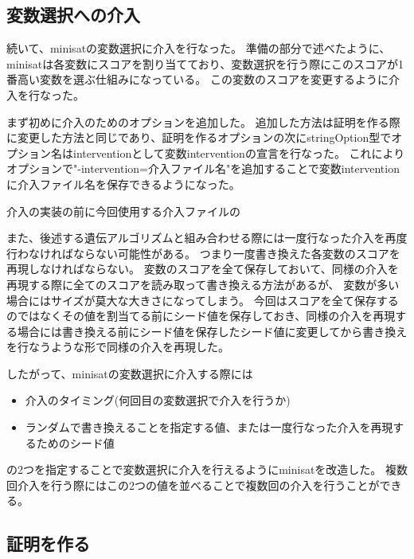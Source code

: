 \subsection{変数選択への介入}







続いて、minisatの変数選択に介入を行なった。
準備の部分で述べたように、minisatは各変数にスコアを割り当てており、変数選択を行う際にこのスコアが1番高い変数を選ぶ仕組みになっている。
この変数のスコアを変更するように介入を行なった。

まず初めに介入のためのオプションを追加した。
追加した方法は証明を作る際に変更した方法と同じであり、証明を作るオプションの次にstringOption型でオプション名はinterventionとして変数interventionの宣言を行なった。
これによりオプションで"-intervention=介入ファイル名"を追加することで変数interventionに介入ファイル名を保存できるようになった。

介入の実装の前に今回使用する介入ファイルの

また、後述する遺伝アルゴリズムと組み合わせる際には一度行なった介入を再度行わなければならない可能性がある。
つまり一度書き換えた各変数のスコアを再現しなければならない。
変数のスコアを全て保存しておいて、同様の介入を再現する際に全てのスコアを読み取って書き換える方法があるが、
変数が多い場合にはサイズが莫大な大きさになってしまう。
今回はスコアを全て保存するのではなくその値を割当てる前にシード値を保存しておき、同様の介入を再現する場合には書き換える前にシード値を保存したシード値に変更してから書き換えを行なうような形で同様の介入を再現した。

したがって、minisatの変数選択に介入する際には
\begin{itemize}
	\item 介入のタイミング(何回目の変数選択で介入を行うか)
	\item ランダムで書き換えることを指定する値、または一度行なった介入を再現するためのシード値
\end{itemize}
の2つを指定することで変数選択に介入を行えるようにminisatを改造した。
複数回介入を行う際にはこの2つの値を並べることで複数回の介入を行うことができる。





\subsection{証明を作る}



